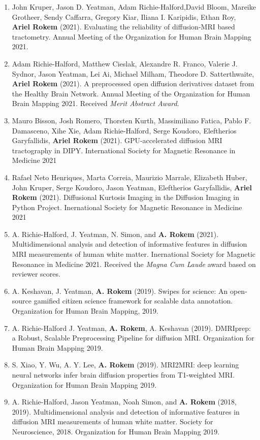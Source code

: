 \documentclass[11pt,fullpage]{article}
\begin{document}
\begin{enumerate}
\item John Kruper, Jason D. Yeatman, Adam Richie-Halford,David Bloom, Mareike Grotheer, Sendy Caffarra, Gregory Kiar, Iliana I. Karipidis, Ethan Roy, {\bf Ariel Rokem} (2021). Evaluating the reliability of diffusion-MRI based tractometry. Annual Meeting of the Organization for Human Brain Mapping 2021.

\item Adam Richie-Halford, Matthew Cieslak, Alexandre R. Franco, Valerie J. Sydnor, Jason Yeatman, Lei Ai, Michael Milham, Theodore D. Satterthwaite, {\bf Ariel Rokem} (2021). A preprocessed open diffusion derivatives dataset from the Healthy Brain Network. Annual Meeting of the Organization for Human Brain Mapping 2021. Received \emph{Merit Abstract Award}.

\item Mauro Bisson, Josh Romero, Thorsten Kurth, Massimiliano Fatica, Pablo F. Damasceno, Xihe Xie, Adam Richie-Halford, Serge Koudoro, Eleftherios Garyfallidis, {\bf Ariel Rokem} (2021). GPU-accelerated diffusion MRI tractography in DIPY. International Society for Magnetic Resonance in Medicine 2021

\item Rafael Neto Henriques, Marta Correia, Maurizio Marrale, Elizabeth Huber, John Kruper, Serge Koudoro, Jason Yeatman, Eleftherios Garyfallidis, {\bf Ariel Rokem} (2021). Diffusional Kurtosis Imaging in the Diffusion Imaging in Python Project. Inernational Society for Magnetic Resonance in Medicine 2021

\item A. Richie-Halford, J. Yeatman, N. Simon, and {\bf A. Rokem} (2021). Multidimensional analysis and detection of informative features in diffusion MRI measurements of human white matter. Inernational Society for Magnetic Resonance in Medicine 2021. Received the \emph{Magna Cum Laude} award based on reviewer scores.

\item A. Keshavan, J. Yeatman, {\bf A. Rokem} (2019). Swipes for science: An
open-source gamified citizen science framework for scalable data annotation.
Organization for Human Brain Mapping, 2019.

\item A. Richie-Halford J. Yeatman, {\bf A. Rokem}, A. Keshavan (2019).
DMRIprep: a Robust, Scalable Preprocessing Pipeline for diffusion MRI.
Organization for Human Brain Mapping 2019.

\item S. Xiao, Y. Wu, A. Y. Lee, {\bf A. Rokem} (2019). MRI2MRI: deep learning
neural networks infer brain diffusion properties from T1-weighted MRI. Organization for Human Brain Mapping 2019.

\item A. Richie-Halford, Jason Yeatman, Noah Simon, and {\bf A. Rokem} (2018, 2019). Multidimensional analysis and detection of informative features in diffusion MRI measurements of human white matter. Society for Neuroscience, 2018. Organization for Human Brain Mapping 2019.

\end{enumerate}
\end{document}
